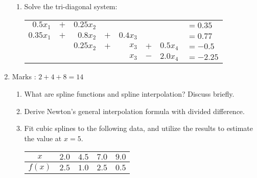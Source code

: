 \documentclass[12pt,class=book,crop=false]{standalone}
\begin{document}
\begin{enumerate}
\begin{enumerate}
              \item Solve the tri-diagonal system:
                    \begin{table}[H]
                        \centering
                        \begin{tabular}{rcrcrcll}
                            $ 0.5 x_1 $  & $ + $ & $ 0.25x_2 $ &       &            &       &            & $ =0.35 $  \\
                            $ 0.35x_1 $ & $ + $ & $ 0.8x_2 $  & $ + $ & $ 0.4x_3 $ &       &            & $ =0.77 $  \\
                                        &       & $ 0.25x_2 $ & $ + $ & $ x_3 $    & $ + $ & $ 0.5x_4 $ & $ =-0.5 $  \\
                                        &       &             &       & $ x_3 $    & $ - $ & $ 2.0x_4 $ & $ =-2.25 $
                        \end{tabular}
                    \end{table}
          \end{enumerate}
    \item Marks : $ 2+4+8=14 $
          \begin{enumerate}
              \item What are spline functions and spline interpolation? Discuss briefly.
              \item Derive Newton's general interpolation formula with divided difference.
              \item Fit cubic splines to the following data, and utilize the results to estimate the value at $ x=5 $.
                    \begin{table}[H]
                        \centering
                        \begin{tabular}{|c|c|c|c|c|}
                            \hline
                            $ x $    & $ 2.0 $ & $ 4.5 $ & $ 7.0 $ & $ 9.0 $ \\\hline
                            $ f(x) $ & $ 2.5 $ & $ 1.0 $ & $ 2.5 $ & $ 0.5 $ \\\hline

\end{tabular}
\end{table}
\end{enumerate}
\end{enumerate}
\end{document}
